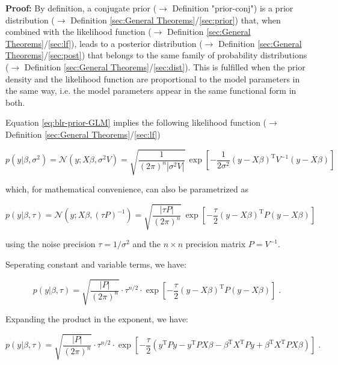 \documentclass[a4paper,12pt,twoside]{book}
\begin{document}
\vspace{1em}
\textbf{Proof:} By definition, a conjugate prior ($\rightarrow$ Definition "prior-conj") is a prior distribution ($\rightarrow$ Definition \ref{sec:General Theorems}/\ref{sec:prior}) that, when combined with the likelihood function ($\rightarrow$ Definition \ref{sec:General Theorems}/\ref{sec:lf}), leads to a posterior distribution ($\rightarrow$ Definition \ref{sec:General Theorems}/\ref{sec:post}) that belongs to the same family of probability distributions ($\rightarrow$ Definition \ref{sec:General Theorems}/\ref{sec:dist}). This is fulfilled when the prior density and the likelihood function are proportional to the model parameters in the same way, i.e. the model parameters appear in the same functional form in both.

Equation \eqref{eq:blr-prior-GLM} implies the following likelihood function ($\rightarrow$ Definition \ref{sec:General Theorems}/\ref{sec:lf})

\begin{equation} \label{eq:blr-prior-GLM-LF-class}
p(y|\beta,\sigma^2) = \mathcal{N}(y; X \beta, \sigma^2 V) = \sqrt{\frac{1}{(2 \pi)^n |\sigma^2 V|}} \, \exp\left[ -\frac{1}{2 \sigma^2} (y-X\beta)^\mathrm{T} V^{-1} (y-X\beta) \right]
\end{equation}

which, for mathematical convenience, can also be parametrized as

\begin{equation} \label{eq:blr-prior-GLM-LF-Bayes}
p(y|\beta,\tau) = \mathcal{N}(y; X \beta, (\tau P)^{-1}) = \sqrt{\frac{|\tau P|}{(2 \pi)^n}} \, \exp\left[ -\frac{\tau}{2} (y-X\beta)^\mathrm{T} P (y-X\beta) \right]
\end{equation}

using the noise precision $\tau = 1/\sigma^2$ and the $n \times n$ precision matrix $P = V^{-1}$.

\vspace{1em}
Seperating constant and variable terms, we have:

\begin{equation} \label{eq:blr-prior-GLM-LF-s1}
p(y|\beta,\tau) = \sqrt{\frac{|P|}{(2 \pi)^n}} \cdot \tau^{n/2} \cdot \exp\left[ -\frac{\tau}{2} (y-X\beta)^\mathrm{T} P (y-X\beta) \right] \; .
\end{equation}

Expanding the product in the exponent, we have:

\begin{equation} \label{eq:blr-prior-GLM-LF-s2}
p(y|\beta,\tau) = \sqrt{\frac{|P|}{(2 \pi)^n}} \cdot \tau^{n/2} \cdot \exp\left[ -\frac{\tau}{2} \left( y^\mathrm{T} P y - y^\mathrm{T} P X \beta - \beta^\mathrm{T} X^\mathrm{T} P y + \beta^\mathrm{T} X^\mathrm{T} P X \beta \right) \right] \; .
\end{equation}
\end{document}
